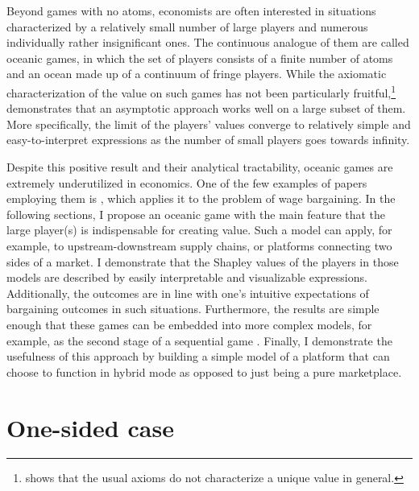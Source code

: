 \documentclass[a4paper]{article}
\begin{document}
Beyond games with no atoms, economists are often interested in situations characterized by a relatively small number of large players and numerous individually rather insignificant ones. The continuous analogue of them are called oceanic games, in which the set of players consists of a finite number of atoms and an ocean made up of a continuum of fringe players. While the axiomatic characterization of the value on such games has not been particularly fruitful,\footnote{\textcite{hart1973values} shows that the usual axioms do not characterize a unique value in general.} \textcite{fogelman1980asymptotic} demonstrates that an asymptotic approach works well on a large subset of them. More specifically, the limit of the players' values converge to relatively simple and easy-to-interpret expressions as the number of small players goes towards infinity.

Despite this positive result and their analytical tractability, oceanic games are extremely underutilized in economics. One of the few examples of papers employing them is \textcite{levy1997individual}, which applies it to the problem of wage bargaining. In the following sections, I propose an oceanic game with the main feature that the large player(s) is indispensable for creating value. Such a model can apply, for example, to upstream-downstream supply chains, or platforms connecting two sides of a market. I demonstrate that the Shapley values of the players in those models are described by easily interpretable and visualizable expressions. Additionally, the outcomes are in line with one's intuitive expectations of bargaining outcomes in such situations. Furthermore, the results are simple enough that these games can be embedded into more complex models, for example, as the second stage of a sequential game \parencite[as in e.g.][]{montez2007downstream}. Finally, I demonstrate the usefulness of this approach by building a simple model of a platform that can choose to function in hybrid mode as opposed to just being a pure marketplace.


\section{One-sided case}
\end{document}
